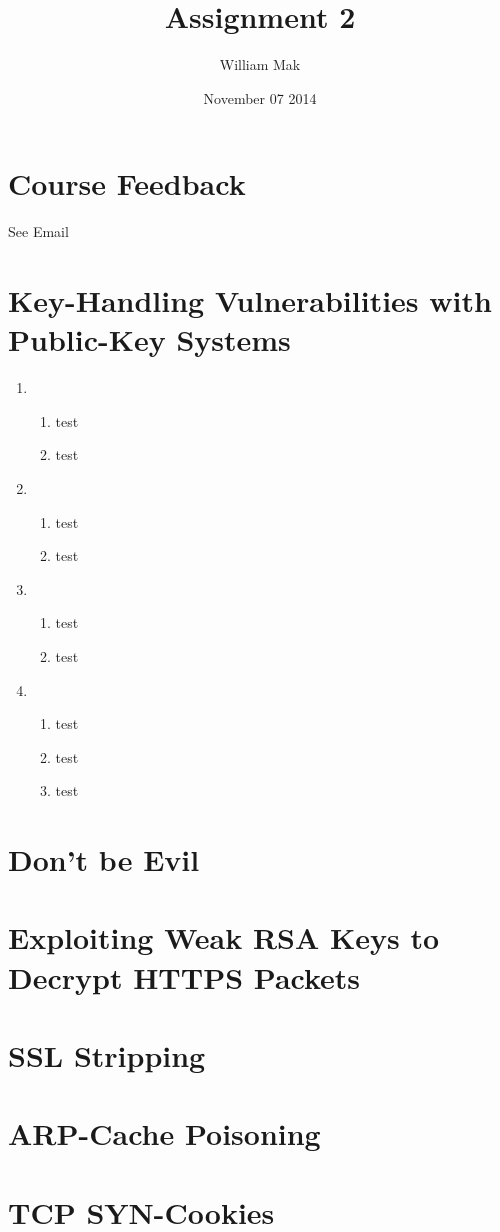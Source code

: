 \documentclass{article}
\title{Assignment 2}
\author{William Mak}
\date{November 07 2014}
\begin{document}
\maketitle

\section{Course Feedback}
See Email
\section{Key-Handling Vulnerabilities with Public-Key Systems}
\begin{enumerate}[A]
\item
    \begin{enumerate}[i]
        \item test
        \item test
    \end{enumerate}
\item
    \begin{enumerate}[i]
        \item test
        \item test
    \end{enumerate}
\item
    \begin{enumerate}[i]
        \item test
        \item test
    \end{enumerate}
\item
    \begin{enumerate}[i]
        \item test
        \item test
        \item test
    \end{enumerate}
\end{enumerate}
\section{Don't be Evil}
\section{Exploiting Weak RSA Keys to Decrypt HTTPS Packets}
\section{SSL Stripping}
\section{ARP-Cache Poisoning}
\section{TCP SYN-Cookies }
\end{document}
